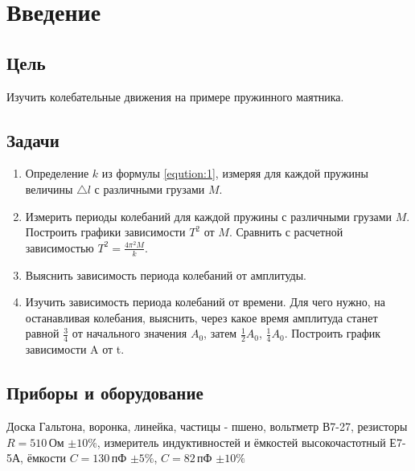 \section{Введение}
\subsection{Цель}
Изучить колебательные движения на примере пружинного маятника.
\subsection{Задачи}
\begin{enumerate}
	\item Определение $k$ из формулы \ref{eqution:1}, измеряя для каждой пружины величины $\triangle l$ с различными грузами $M$.
	
	\item Измерить периоды колебаний для каждой пружины с различными грузами $M$. Построить графики зависимости $T^2$ от $M$. Сравнить с расчетной зависимостью $T^2 = \frac{4 \pi ^ 2 M}{k}$.
	
	\item Выяснить зависимость периода колебаний от амплитуды.
	
	\item Изучить зависимость периода колебаний от времени. Для чего нужно, на останавливая колебания, выяснить, через какое время амплитуда станет равной $\frac{3}{4}$ от начального значения $A_0$, затем $\frac{1}{2} A_0$, $\frac{1}{4} A_0$. Построить график зависимости A от t.
\end{enumerate}
\subsection{Приборы и оборудование}
Доска Гальтона, воронка, линейка, частицы - пшено, вольтметр В7-27, резисторы $R = 510\,$Ом $\pm10\%$, измеритель индуктивностей и ёмкостей высокочастотный Е7-5А, ёмкости $ C = 130\,$пФ $\pm5\%$, $C = 82\,$пФ $\pm10\%$